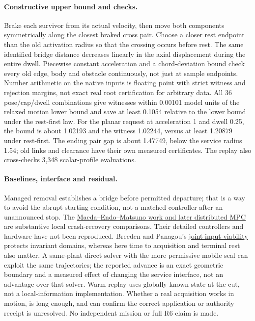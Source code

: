 \documentclass[11pt]{article}
\begin{document}
\paragraph{Constructive upper bound and checks.}
Brake each survivor from its actual velocity, then move both
components symmetrically along the closest braked cross pair.
Choose a closer rest endpoint than the old activation radius
so that the crossing occurs before rest. The same identified
bridge distance decreases linearly in the axial displacement
during the entire dwell. Piecewise constant acceleration and
a chord-deviation bound check every old edge, body and obstacle
continuously, not just at sample endpoints. Number arithmetic on
the native inputs is floating point with strict witness and
rejection margins, not exact real root certification for arbitrary
data. All 36 pose/cap/dwell combinations give witnesses within
0.00101 model units of the relaxed motion lower bound and save at
least 0.1054 relative to the lower bound under the rest-first
law. For the planar request at acceleration 1 and dwell 0.25,
the bound is about 1.02193 and the witness 1.02244, versus at
least 1.20879 under rest-first. The ending pair gap is about
1.47749, below the service radius 1.54; old links and clearance
have their own measured certificates. The replay also cross-checks
3,348 scalar-profile evaluations.

\paragraph{Baselines, interface and residual.}
Managed removal establishes a bridge before permitted departure;
that is a way to avoid the abrupt starting condition, not a
matched controller after an unannounced stop. The
\href{https://en.endo-lab.jp/research/detail/499}{Maeda--Endo--Matsuno
work and later distributed MPC} are substantive local
crash-recovery comparisons. Their detailed controllers and
hardware have not been reproduced. Breeden and Panagou's
\href{https://arxiv.org/abs/2210.01354}{joint input viability}
protects invariant domains, whereas here time to acquisition
and terminal rest also matter. A same-plant direct solver with
the more permissive mobile seal can exploit the same trajectories;
the reported advance is an exact geometric boundary and a
measured effect of changing the service interface, not an
advantage over that solver. Warm replay uses globally known
state at the cut, not a local-information implementation.
Whether a real acquisition works in motion, is long enough,
and can confirm the correct application or authority receipt is
unresolved. No independent mission or full R6 claim is made.
\end{document}
